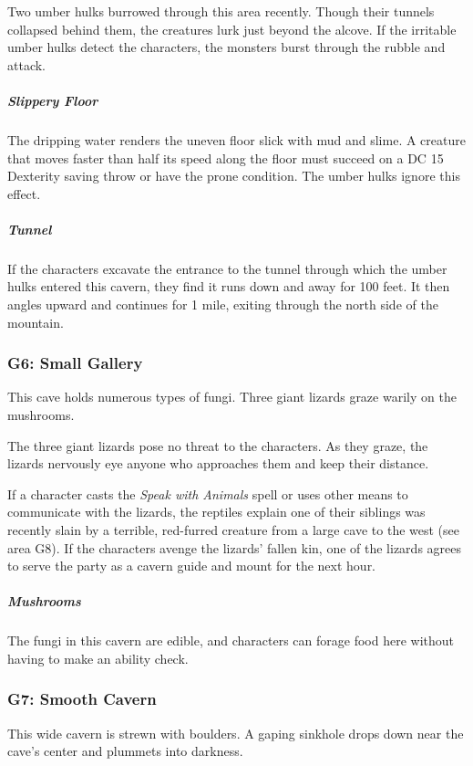 \documentclass[10pt,a4paper,twoside,bg=print,twocolumn,openany,nodeprecatedcode]{dndbook}
\begin{document}
Two umber hulks burrowed through this area recently. Though their tunnels collapsed behind them, the creatures lurk just beyond the alcove. If the irritable umber hulks detect the characters, the monsters burst through the rubble and attack.

\subparagraph{Slippery Floor}
The dripping water renders the uneven floor slick with mud and slime. A creature that moves faster than half its speed along the floor must succeed on a DC 15 Dexterity saving throw or have the prone condition. The umber hulks ignore this effect.

\subparagraph{Tunnel}
If the characters excavate the entrance to the tunnel through which the umber hulks entered this cavern, they find it runs down and away for 100 feet. It then angles upward and continues for 1 mile, exiting through the north side of the mountain.

\subsubsection{G6: Small Gallery}
\begin{DndReadAloud}{}
This cave holds numerous types of fungi. Three giant lizards graze warily on the mushrooms.

\end{DndReadAloud}

The three giant lizards pose no threat to the characters. As they graze, the lizards nervously eye anyone who approaches them and keep their distance.

If a character casts the \textit{Speak with Animals} spell or uses other means to communicate with the lizards, the reptiles explain one of their siblings was recently slain by a terrible, red-furred creature from a large cave to the west (see area G8). If the characters avenge the lizards' fallen kin, one of the lizards agrees to serve the party as a cavern guide and mount for the next hour.

\subparagraph{Mushrooms}
The fungi in this cavern are edible, and characters can forage food here without having to make an ability check.

\subsubsection{G7: Smooth Cavern}
\begin{DndReadAloud}{}
This wide cavern is strewn with boulders. A gaping sinkhole drops down near the cave's center and plummets into darkness.

\end{DndReadAloud}
\end{document}

